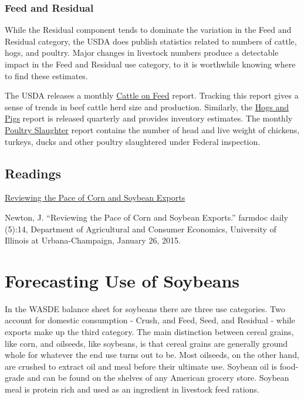 \documentclass[
]{book}
\begin{document}
\hypertarget{feed-and-residual-1}{%
\subsection{Feed and Residual}\label{feed-and-residual-1}}

While the Residual component tends to dominate the variation in the Feed and Residual category, the USDA does publish statistics related to numbers of cattle, hogs, and poultry. Major changes in livestock numbers produce a detectable impact in the Feed and Residual use category, to it is worthwhile knowing where to find these estimates.

The USDA releases a monthly \href{http://usda.mannlib.cornell.edu/MannUsda/viewDocumentInfo.do?documentID=1020}{Cattle on Feed} report. Tracking this report gives a sense of trends in beef cattle herd size and production. Similarly, the \href{http://usda.mannlib.cornell.edu/MannUsda/viewDocumentInfo.do?documentID=1086}{Hogs and Pigs} report is released quarterly and provides inventory estimates. The monthly \href{https://usda.mannlib.cornell.edu/MannUsda/viewDocumentInfo.do?documentID=1131}{Poultry Slaughter} report contains the number of head and live weight of chickens, turkeys, ducks and other poultry slaughtered under Federal inspection.

\hypertarget{readings-3}{%
\section{Readings}\label{readings-3}}

\href{http://farmdocdaily.illinois.edu/2015/01/reviewing-pace-of-corn-and-soybean-exports.html}{Reviewing the Pace of Corn and Soybean Exports}

Newton, J. ``Reviewing the Pace of Corn and Soybean Exports.'' farmdoc daily (5):14, Department of Agricultural and Consumer Economics, University of Illinois at Urbana-Champaign, January 26, 2015.

\hypertarget{forecasting-use-of-soybeans}{%
\chapter{Forecasting Use of Soybeans}\label{forecasting-use-of-soybeans}}

In the WASDE balance sheet for soybeans there are three use categories. Two account for domestic consumption - Crush, and Feed, Seed, and Residual - while exports make up the third category. The main distinction between cereal grains, like corn, and oilseeds, like soybeans, is that cereal grains are generally ground whole for whatever the end use turns out to be. Most oilseeds, on the other hand, are crushed to extract oil and meal before their ultimate use. Soybean oil is food-grade and can be found on the shelves of any American grocery store. Soybean meal is protein rich and used as an ingredient in livestock feed rations.
\end{document}
